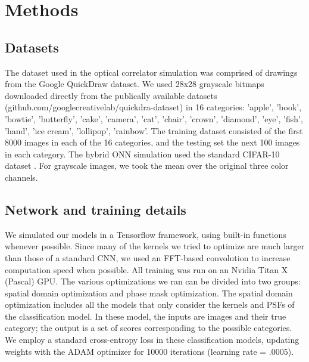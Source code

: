 \documentclass[fleqn,10pt]{wlscirep}
\begin{document}

\section*{Methods}
\subsection*{Datasets} 
The dataset used in the optical correlator simulation was comprised of drawings from the Google QuickDraw dataset. We used 28x28 grayscale bitmaps downloaded directly from the publically available datasets (github.com/googlecreativelab/quickdra-dataset) in 16 categories: 'apple', 'book', 'bowtie', 'butterfly', 'cake', 'camera', 'cat', 'chair', 'crown', 'diamond', 'eye', 'fish', 'hand', 'ice cream', 'lollipop', 'rainbow'. The training dataset consisted of the first 8000 images in each of the 16 categories, and the testing set the next 100 images in each category. The hybrid ONN simulation used the standard CIFAR-10 dataset \cite{krizhevsky2009learning}. For grayscale images, we took the mean over the original three color channels.

\subsection*{Network and training details}
We simulated our models in a Tensorflow framework, using built-in functions whenever possible. Since many of the kernels we tried to optimize are much larger than those of a standard CNN, we used an FFT-based convolution to increase computation speed when possible. All training was run on an Nvidia Titan X (Pascal) GPU. The various optimizations we ran can be divided into two groups: spatial domain optimization and phase mask optimization. The spatial domain optimization includes all the models that only consider the kernels and PSFs of the classification model. In these model, the inputs are images and their true category; the output is a set of scores corresponding to the possible categories. We employ a standard cross-entropy loss in these classification models, updating weights with the ADAM optimizer for 10000 iterations (learning rate = .0005). 
\end{document}
